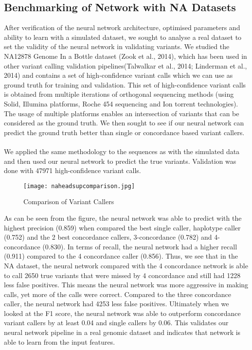 \documentclass{article}
\begin{document}
\subsection{Benchmarking of Network with NA Datasets}
After verification of the neural network architecture, optimised parameters and ability to learn with a simulated dataset, we sought to analyse a real dataset to set the validity of the neural network in validating variants. We studied the NA12878 Genome In a Bottle dataset (Zook et al., 2014), which has been used in other variant calling validation pipelines(Talwalkar et al., 2014; Linderman et al., 2014) and contains a set of high-confidence variant calls which we can use as ground truth for training and validation. This set of high-confidence variant calls is obtained from multiple iterations of orthogonal sequencing methods (using Solid, Illumina platforms, Roche 454 sequencing and Ion torrent technologies). The usage of multiple platforms enables an intersection of variants that can be considered as the ground truth. We then sought to see if our neural network can predict the ground truth better than single or concordance based variant callers. \\\\We applied the same methodology to the sequences as with the simulated data and then used our neural network to predict the true variants. Validation was done with 47971 high-confidence variant calls.
\begin{figure}[H]
\texttt{[image: naheadsupcomparison.jpg]}
\caption{Comparison of Variant Callers}
\centering
\end{figure}
As can be seen from the figure, the neural network was able to predict with the highest precision (0.859) when compared the best single caller, haplotype caller (0.752) and the 2 best concordance callers, 3-concordance (0.782) and 4-concordance (0.830). In terms of recall, the neural network had a higher recall (0.911) compared to the 4 concordance caller (0.856). Thus, we see that in the NA dataset, the neural network compared with the 4 concordance network is able to call 2650 true variants that were missed by 4 concordance and still had 1228 less false positives. This means the neural network was more aggressive in making calls, yet more of the calls were correct. Compared to the three concordance caller, the neural network had 4253 less false positives. Ultimately when we looked at the F1 score, the neural network was able to outperform concordance variant callers by at least 0.04 and single callers by 0.06. This validates our neural network pipeline in a real genomic dataset and indicates that network is able to learn from the input features.
\newpage
\end{document}
